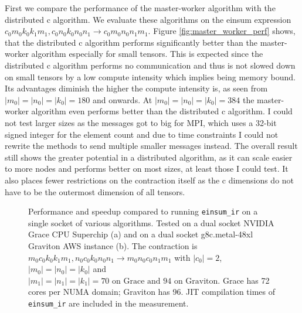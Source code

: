 First we compare the performance of the master-worker algorithm with the distributed c algorithm.
We evaluate these algorithms on the einsum expression $c_0m_0k_0k_1m_1, c_0n_0k_0n_0n_1 \rightarrow c_0m_0n_0n_1m_1$.
Figure \ref{fig:master_worker_perf} shows, that the distributed c algorithm performs significantly better than the master-worker algorithm especially for small tensors.
This is expected since the distributed c algorithm performs no communication and thus is not slowed down on small tensors by a low compute intensity which implies being memory bound.
Its advantages diminish the higher the compute intensity is, as seen from $|m_0|=|n_0|=|k_0|= 180$ and onwards.
At $|m_0|=|n_0|=|k_0|= 384$ the master-worker algorithm even performs better than the distributed c algorithm.
I could not test larger sizes as the messages got to big for MPI, which uses a 32-bit signed integer for the element count and due to time constraints I could not rewrite the methods to send multiple smaller messages instead.
The overall result still shows the greater potential in a distributed algorithm, as it can scale easier to more nodes and performs better on most sizes, at least those I could test.
It also places fewer restrictions on the contraction itself as the c dimensions do not have to be the outermost dimension of all tensors.

\begin{figure}[ht]
  \centering
    \begin{subfigure}[t]{1\textwidth}
      
    \end{subfigure}
  \caption{
    Performance and speedup compared to running \texttt{einsum\_ir} on a single socket of various algorithms.
    Tested on a dual socket NVIDIA Grace CPU Superchip (a) and on a dual socket g8c.metal-48xl Graviton AWS instance (b).
    The contraction is $m_0c_0k_0k_1m_1, n_0c_0k_0n_0n_1 \rightarrow m_0n_0c_0n_1m_1$ with $|c_0|=2$, $|m_0|=|n_0|=|k_0|$ and $|m_1|=|n_1|=|k_1|=70\text{ on Grace and } 94\text{ on Graviton}$.
    Grace has 72 cores per NUMA domain; Graviton has 96.
    JIT compilation times of \texttt{einsum\_ir} are included in the measurement.
    }
  \label{fig:einsum_ir_perf}
\end{figure}

